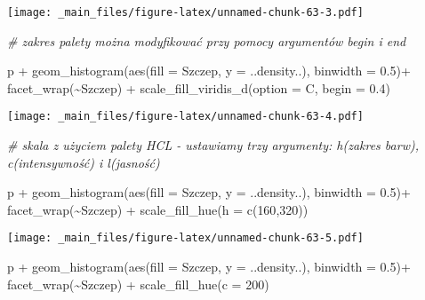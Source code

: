 \documentclass[
]{book}
\newenvironment{Shaded}{\begin{snugshade}}{\end{snugshade}}
\newcommand{\AttributeTok}[1]{\textcolor[rgb]{0.77,0.63,0.00}{#1}}
\newcommand{\CommentTok}[1]{\textcolor[rgb]{0.56,0.35,0.01}{\textit{#1}}}
\newcommand{\DecValTok}[1]{\textcolor[rgb]{0.00,0.00,0.81}{#1}}
\newcommand{\FloatTok}[1]{\textcolor[rgb]{0.00,0.00,0.81}{#1}}
\newcommand{\FunctionTok}[1]{\textcolor[rgb]{0.00,0.00,0.00}{#1}}
\newcommand{\NormalTok}[1]{#1}
\newcommand{\SpecialCharTok}[1]{\textcolor[rgb]{0.00,0.00,0.00}{#1}}
\newcommand{\StringTok}[1]{\textcolor[rgb]{0.31,0.60,0.02}{#1}}
\begin{document}
\texttt{[image: \_main\_files/figure-latex/unnamed-chunk-63-3.pdf]}

\begin{Shaded}
\begin{Highlighting}[]
\CommentTok{\# zakres palety można modyfikować przy pomocy argumentów begin i end}

\NormalTok{p }\SpecialCharTok{+} \FunctionTok{geom\_histogram}\NormalTok{(}\FunctionTok{aes}\NormalTok{(}\AttributeTok{fill =}\NormalTok{ Szczep, }\AttributeTok{y =}\NormalTok{ ..density..), }\AttributeTok{binwidth =} \FloatTok{0.5}\NormalTok{)}\SpecialCharTok{+}
  \FunctionTok{facet\_wrap}\NormalTok{(}\SpecialCharTok{\textasciitilde{}}\NormalTok{Szczep) }\SpecialCharTok{+} \FunctionTok{scale\_fill\_viridis\_d}\NormalTok{(}\AttributeTok{option =} \StringTok{\textquotesingle{}C\textquotesingle{}}\NormalTok{, }\AttributeTok{begin =} \FloatTok{0.4}\NormalTok{)}
\end{Highlighting}
\end{Shaded}

\texttt{[image: \_main\_files/figure-latex/unnamed-chunk-63-4.pdf]}

\begin{Shaded}
\begin{Highlighting}[]
\CommentTok{\# skala z użyciem palety HCL {-} ustawiamy trzy argumenty: h(zakres barw), c(intensywność) i l(jasność)}

\NormalTok{p }\SpecialCharTok{+} \FunctionTok{geom\_histogram}\NormalTok{(}\FunctionTok{aes}\NormalTok{(}\AttributeTok{fill =}\NormalTok{ Szczep, }\AttributeTok{y =}\NormalTok{ ..density..), }\AttributeTok{binwidth =} \FloatTok{0.5}\NormalTok{)}\SpecialCharTok{+}
  \FunctionTok{facet\_wrap}\NormalTok{(}\SpecialCharTok{\textasciitilde{}}\NormalTok{Szczep) }\SpecialCharTok{+} \FunctionTok{scale\_fill\_hue}\NormalTok{(}\AttributeTok{h =} \FunctionTok{c}\NormalTok{(}\DecValTok{160}\NormalTok{,}\DecValTok{320}\NormalTok{))}
\end{Highlighting}
\end{Shaded}

\texttt{[image: \_main\_files/figure-latex/unnamed-chunk-63-5.pdf]}

\begin{Shaded}
\begin{Highlighting}[]
\NormalTok{p }\SpecialCharTok{+} \FunctionTok{geom\_histogram}\NormalTok{(}\FunctionTok{aes}\NormalTok{(}\AttributeTok{fill =}\NormalTok{ Szczep, }\AttributeTok{y =}\NormalTok{ ..density..), }\AttributeTok{binwidth =} \FloatTok{0.5}\NormalTok{)}\SpecialCharTok{+}
  \FunctionTok{facet\_wrap}\NormalTok{(}\SpecialCharTok{\textasciitilde{}}\NormalTok{Szczep) }\SpecialCharTok{+} \FunctionTok{scale\_fill\_hue}\NormalTok{(}\AttributeTok{c =} \DecValTok{200}\NormalTok{)}
\end{Highlighting}
\end{Shaded}
\end{document}
